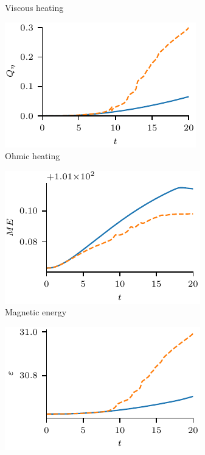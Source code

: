 \begin{figure}[t]
\begin{subfigure}{0.32\textwidth}
    \caption{Viscous heating}%
    \label{fig:v-4r-4_viscous_heating}
  \end{subfigure}
  \hfill
  \begin{subfigure}{0.32\textwidth}
    \includegraphics[width=\linewidth]{v-4r-4_ohmic_heating}
    \caption{Ohmic heating}%
    \label{fig:v-4r-4_ohmic_heating}
  \end{subfigure}
  \hfill
  \begin{subfigure}{0.32\textwidth}
    \includegraphics[width=\linewidth]{v-4r-4_magnetic_energy}
    \caption{Magnetic energy}%
    \label{fig:v-4r-4_magnetic_energy}
  \end{subfigure}
  \hfill
  \begin{subfigure}{0.32\textwidth}
    \includegraphics[width=\linewidth]{v-4r-4_internal_energy}

\end{subfigure}
\end{figure}
